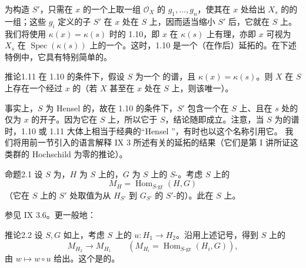 为构造 $S'$，只需在 $x$ 的一个上取一组 $\mathscr O_X$ 的 $g_1,\ldots,g_n$，使其在 $x$ 处给出 $X_s$ 的的一组；这些 $g_i$ 定义的子 $S'$ 在 $x$ 处在 $S$ 上，因而适当缩小 $S'$ 后，它就在 $S$ 上。
我们将使用 $\kappa(x)=\kappa(s)$ 时的 1.10，即 $x$ 在 $\kappa(s)$ 上有理，亦即 $x$ 可视为 $X_s$ 在 $\operatorname{Spec}(\kappa(s))$ 上的一个。这时，1.10 是一个（在作后）延拓的。在下述特例中，它具有特别简单的。
\begin{SGAresult}{推论}{1.11}
在 1.10 的条件下，假设 $S$ 为一个 的谱，且 $\kappa(x)=\kappa(s)$。则 $X$ 在 $S$ 上存在一个经过 $x$ 的（若 $X$ 甚至在 $x$ 处在 $S$ 上，则该唯一）。
\end{SGAresult}
事实上，$S$ 为 Hensel 的，故在 1.10 的条件下，$S'$ 包含一个在 $S$ 上、且在 $s$ 处的仅为 $x$ 的开子。因为它在 $S$ 上，所以它于 $S$，结论随即成立。注意，当 $S$ 为的谱时，1.10 或 1.11 大体上相当于经典的“Hensel ”，有时也以这个名称引用它。
我们将用前一节引入的语言解释 IX 3 所述有关的延拓的结果（它们是第 I 讲所证这类群的 Hochschild 为零的推论）。
\begin{SGAresult}{命题}{2.1}
设 $S$ 为，$H$ 为 $S$ 上的，$G$ 为 $S$ 上的 $S$-。考虑 $S$ 上的
\[M_H=\operatorname{Hom}_{S\text{-gr}}(H,G)\]
（它在 $S$ 上的 $S'$ 处取值为从 $H_{S'}$ 到 $G_{S'}$ 的 $S'$-的）。此在 $S$ 上。
\end{SGAresult}
参见 IX 3.6。更一般地：
\begin{SGAresult}{推论}{2.2}
设 $S,G$ 如上，考虑 $S$ 上的 $u:H_1\to H_2$。沿用上述记号，得到 $S$ 上的
\[M_{H_2}\longrightarrow M_{H_1}\qquad(M_{H_i}=\operatorname{Hom}_{S\text{-gr}}(H_i,G)),\]
由 $w\mapsto w\circ u$ 给出。这个是的。
\end{SGAresult}
